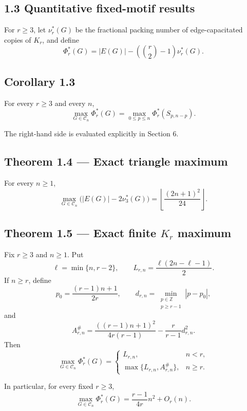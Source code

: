 \documentclass[11pt,a4paper]{article}
\begin{document}
\subsection{1.3 Quantitative fixed-motif results}\label{quantitative-fixed-motif-results}

For \(r\ge3\), let \(\nu_r^*(G)\) be the fractional packing number of
edge-capacitated copies of \(K_r\), and define
\[
\Phi_r^*(G)
=
|E(G)|
-
\left(\binom r2-1\right)\nu_r^*(G).
\tag{1.7}
\]

\subsection{Corollary 1.3}\label{corollary-1.3}

For every \(r\ge3\) and every \(n\),
\[
\max_{G\in\mathcal C_n}\Phi_r^*(G)
=
\max_{0\le p\le n}\Phi_r^*(S_{p,n-p}).
\tag{1.8}
\]

The right-hand side is evaluated explicitly in Section 6.

\subsection{Theorem 1.4 --- Exact triangle maximum}\label{theorem-1.4-exact-triangle-maximum}

For every \(n\ge1\),
\[
\boxed{
\max_{G\in\mathcal C_n}
\bigl(|E(G)|-2\nu_3^*(G)\bigr)
=
\left\lfloor
\frac{(2n+1)^2}{24}
\right\rfloor.
}
\tag{1.9}
\]

\subsection{\texorpdfstring{Theorem 1.5 --- Exact finite \(K_r\) maximum}{Theorem 1.5 --- Exact finite K\_r maximum}}\label{theorem-1.5-exact-finite-k_r-maximum}

Fix \(r\ge3\) and \(n\ge1\). Put
\[
\ell=\min\{n,r-2\},
\qquad
L_{r,n}=\frac{\ell(2n-\ell-1)}2.
\tag{1.10}
\]
If \(n\ge r\), define
\[
p_0=\frac{(r-1)n+1}{2r},
\qquad
d_{r,n}=\min_{\substack{p\in\mathbb Z\\p\ge r-1}}|p-p_0|,
\tag{1.11}
\]
and
\[
A_{r,n}^{\#}
=
\frac{((r-1)n+1)^2}{4r(r-1)}
-
\frac r{r-1}d_{r,n}^2.
\tag{1.12}
\]
Then
\[
\boxed{
\max_{G\in\mathcal C_n}\Phi_r^*(G)
=
\begin{cases}
L_{r,n},&n<r,\\[2mm]
\max\{L_{r,n},A_{r,n}^{\#}\},&n\ge r.
\end{cases}
}
\tag{1.13}
\]

In particular, for every fixed \(r\ge3\),
\[
\max_{G\in\mathcal C_n}\Phi_r^*(G)
=
\frac{r-1}{4r}n^2+O_r(n).
\tag{1.14}
\]
\end{document}
